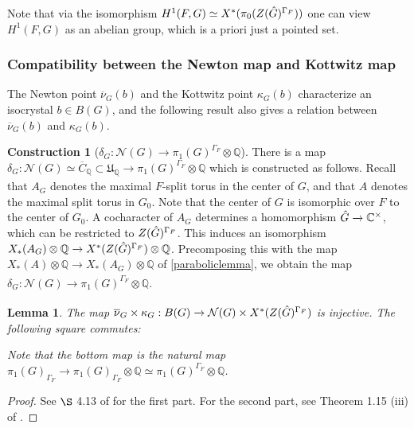 \documentclass[11pt,a4paper]{article}
\theoremstyle{definition}
\newtheorem{const}[shared]{Construction}
\theoremstyle{plain}
\newtheorem{Le}[shared]{Lemma}
\theoremstyle{remark}
\theoremstyle{plain}
\begin{document}
Note that via the isomorphism $H^1(F,G) \simeq X^*(\pi_0(Z(\Hat{G})^{\Gamma_F}))$ one can view $H^1(F,G)$ as an abelian group, which is a priori just a pointed set.

\subsubsection{Compatibility between the Newton map and Kottwitz map}
The Newton point $\overline{\nu}_G(b)$ and the Kottwitz point $\kappa_G(b)$ characterize an isocrystal $b \in B(G)$, and the following result also gives a relation between $\overline{\nu}_G(b)$ and $\kappa_G(b)$.

\begin{const}[$\delta_G: \mathcal{N}(G) \rightarrow \pi_1(G)^{\Gamma_F} \otimes \mathbb{Q}$]
    There is a map $\delta_G: \mathcal{N}(G) \simeq \overline{C}_{\mathbb{Q}} \subset \mathfrak{U}_{\mathbb{Q}} \xrightarrow[]{} \pi_1(G)^{\Gamma_F}\otimes \mathbb{Q}$ which is constructed as follows. Recall that $A_G$ denotes the maximal $F$-split torus in the center of $G$, and that $A$ denotes the maximal split torus in $G_0$. Note that the center of $G$ is isomorphic over $F$ to the center of $G_0$. A cocharacter of $A_G$ determines a homomorphism $\Hat{G} \xrightarrow[]{} \mathbb{C}^{\times}$, which can be restricted to $Z(\Hat{G})^{\Gamma_F}$. This induces an isomorphism $X_*(A_G) \otimes \mathbb{Q} \xrightarrow[]{} X^*(Z(\Hat{G})^{\Gamma_F}) \otimes \mathbb{Q}$. Precomposing this with the map $X_*(A) \otimes \mathbb{Q} \xrightarrow[]{} X_*(A_G) \otimes \mathbb{Q}$ of \ref{paraboliclemma}, we obtain the map $\delta_G: \mathcal{N}(G) \xrightarrow[]{} \pi_1(G)^{\Gamma_F} \otimes \mathbb{Q}$.
\end{const}

\begin{Le}\label{Newonkottwitzcharisoc}
    The map $\overline{\nu}_G \times \kappa_G:  B(G) \xrightarrow[]{} \mathcal{N}(G) \times X^*(Z(\Hat{G})^{\Gamma_F})$ is injective. The following square commutes:
\begin{center}
\end{center}
Note that the bottom map is the natural map $\pi_1(G)_{\Gamma_F} \xrightarrow[]{} \pi_1(G)_{\Gamma_F} \otimes \mathbb{Q} \simeq \pi_1(G)^{\Gamma_F} \otimes \mathbb{Q}$.
\end{Le}
\begin{proof}
    See $\S$ 4.13 of \cite{MR1485921} for the first part. For the second part, see Theorem 1.15 (iii) of \cite{MR1411570}.
\end{proof}
\end{document}
